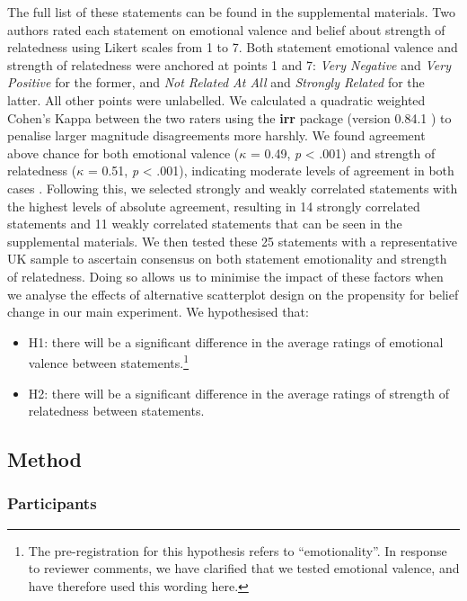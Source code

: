 \documentclass[sigconf]{acmart}
\providecommand{\tightlist}{%
  \setlength{\itemsep}{0pt}\setlength{\parskip}{0pt}}\usepackage{longtable,booktabs,array}
\begin{document}
The full list of these statements can be found in the supplemental
materials. Two authors rated each statement on emotional valence and
belief about strength of relatedness using Likert scales from 1 to 7.
Both statement emotional valence and strength of relatedness were
anchored at points 1 and 7: \emph{Very Negative} and \emph{Very
Positive} for the former, and \emph{Not Related At All} and
\emph{Strongly Related} for the latter. All other points were
unlabelled. We calculated a quadratic weighted Cohen's Kappa between the
two raters using the \textbf{irr} package (version 0.84.1 \citep{irr})
to penalise larger magnitude disagreements more harshly. We found
agreement above chance for both emotional valence (\(\kappa\) = 0.49,
\emph{p} \textless{} .001) and strength of relatedness (\(\kappa\) =
0.51, \emph{p} \textless{} .001), indicating moderate levels of
agreement in both cases \citep{cohen_1968, fleiss_1969}. Following this,
we selected strongly and weakly correlated statements with the highest
levels of absolute agreement, resulting in 14 strongly correlated
statements and 11 weakly correlated statements that can be seen in the
supplemental materials. We then tested these 25 statements with a
representative UK sample to ascertain consensus on both statement
emotionality and strength of relatedness. Doing so allows us to minimise
the impact of these factors when we analyse the effects of alternative
scatterplot design on the propensity for belief change in our main
experiment. We hypothesised that:

\begin{itemize}
\tightlist
\item
  H1: there will be a significant difference in the average ratings of
  emotional valence between statements.\footnote{The pre-registration
    for this hypothesis refers to ``emotionality''. In response to
    reviewer comments, we have clarified that we tested emotional
    valence, and have therefore used this wording here.}
\item
  H2: there will be a significant difference in the average ratings of
  strength of relatedness between statements.
\end{itemize}

\subsection{Method}\label{sec-method-pre}

\subsubsection{Participants}\label{sec-participants-pre}
\end{document}
